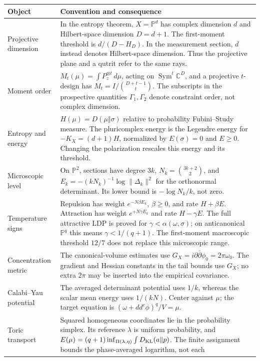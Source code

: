 \renewcommand{\arraystretch}{1.14}
\begin{longtable}{@{}p{.23\linewidth}p{.72\linewidth}@{}}
\toprule
Object & Convention and consequence\\
\midrule\endhead
Projective dimension & In the entropy theorem, $X=\mathbb P^d$ has
complex dimension $d$ and Hilbert-space dimension $D=d+1$.
The first-moment threshold is $d/(D-H_D)$. In the measurement section,
$d$ instead denotes Hilbert-space dimension. Thus the projective plane
and a qutrit refer to the same rays.\\
Moment order & $M_t(\mu)=\int P_z^{\otimes t}\,d\mu$, acting on
$\operatorname{Sym}^t\mathbb C^D$, and a projective $t$-design has
$M_t=I/\binom{D+t-1}{t}$. The subscripts in the prospective quantities
$\Gamma_1,\Gamma_2$ denote constraint order, not complex dimension.\\
Entropy and energy & $H(\mu)=D(\mu\Vert\sigma)$ relative to probability
Fubini--Study measure. The pluricomplex energy is the Legendre energy for
$-K_X=(d+1)H$, normalized by $E(\sigma)=0$ and $E\ge0$.
Changing the polarization rescales this energy and its threshold.\\
Microscopic level & On $\mathbb P^2$, sections have degree $3k$,
$N_k=\binom{3k+2}{2}$, and
$E_k=-(kN_k)^{-1}\log\|\Delta_k\|^2$ for the orthonormal determinant.
Its lower bound is $-\log N_k/k$, not zero.\\
Temperature signs & Repulsion has weight $e^{-N\beta E_k}$,
$\beta\ge0$, and rate $H+\beta E$. Attraction has weight
$e^{+N\gamma E_k}$ and rate $H-\gamma E$. The full attractive LDP
is proved for $\gamma<\alpha(\omega,\sigma)$; on anticanonical
$\mathbb P^q$ this means $\gamma<1/(q+1)$. The first-moment
macroscopic threshold $12/7$ does not replace this microscopic range.\\
Concentration metric & The canonical-volume estimates use
$G_X=i\partial\bar\partial\phi_0=2\pi\omega_0$.
The gradient and Hessian constants in the tail bounds use $G_X$;
no extra $2\pi$ may be inserted into the empirical covariance.\\
Calabi--Yau potential & The averaged determinant potential uses $1/k$,
whereas the scalar mean energy uses $1/(kN)$. Center against $\mu$;
the target equation is $(\omega+dd^c\phi)^q/V=\mu$.\\
Toric transport & Squared homogeneous coordinates lie in the probability
simplex. Its reference $\lambda$ is uniform probability, and
$E(\mu)=(q+1)\inf_{\Pi(\lambda,\eta)}\int D_{\rm KL}(a\Vert p)$.
The finite assignment bounds the phase-averaged logarithm, not each

\end{longtable}
